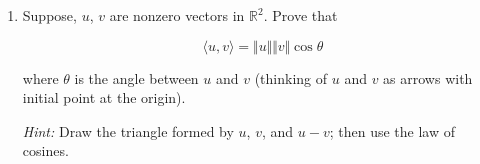 \documentclass[fleqn]{article}
\makeatletter
\newenvironment{equationCenter}{\@fleqnfalse\begin{equation*}}{\end{equation*}}
\makeatother
\begin{document}
\begin{enumerate}[nolistsep]
		\item Suppose, $u$, $v$ are nonzero vectors in $\mathbb{R}^2$. Prove that
		
			\begin{equationCenter}
				\langle u,v \rangle = \Vert u \Vert \Vert v \Vert \cos \theta
			\end{equationCenter}
			
			where $\theta$ is the angle between $u$ and $v$ (thinking of $u$ and $v$ as arrows with initial point at the origin).
			
			\textit{Hint:} Draw the triangle formed by $u$, $v$, and $u-v$; then use the law of cosines.
			
	\end{enumerate}
\end{document}
